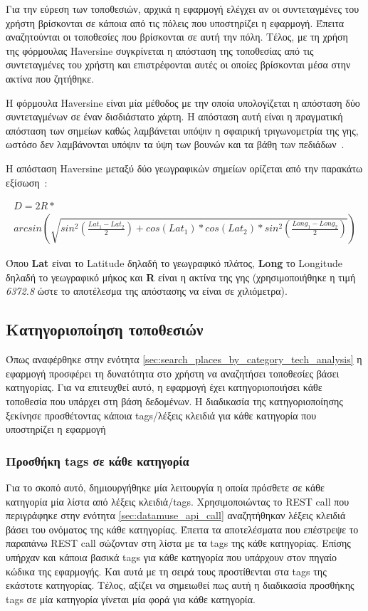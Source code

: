 \documentclass[oneside, 12pt]{book}
\begin{document}
Για την εύρεση των τοποθεσιών, αρχικά η εφαρμογή ελέγχει αν οι 
συντεταγμένες του χρήστη βρίσκονται σε κάποια από τις πόλεις που 
υποστηρίζει η εφαρμογή. Έπειτα αναζητούνται οι τοποθεσίες που 
βρίσκονται σε αυτή την πόλη. Τέλος, με τη χρήση της φόρμουλας 
Haversine συγκρίνεται η απόσταση της τοποθεσίας από τις 
συντεταγμένες του χρήστη και επιστρέφονται αυτές οι οποίες 
βρίσκονται μέσα στην ακτίνα που ζητήθηκε.

Η φόρμουλα Haversine είναι μία μέθοδος με την οποία υπολογίζεται η 
απόσταση δύο συντεταγμένων σε έναν δισδιάστατο χάρτη. Η απόσταση 
αυτή είναι η πραγματική απόσταση των σημείων καθώς λαμβάνεται 
υπόψιν η σφαιρική τριγωνομετρία της γης, ωστόσο δεν λαμβάνονται 
υπόψιν τα ύψη των βουνών και τα βάθη των πεδιάδων~\cite{alam2016implementation}.

Η απόσταση Haversine μεταξύ δύο γεωγραφικών σημείων ορίζεται από την παρακάτω εξίσωση~\cite{yoga2017implementation}:

\begin{multline} \label{eq:haversine_equation}
    D = 2R*\\
    arcsin\left(\sqrt{sin^2(\frac{Lat_1-Lat_2}{2})+cos(Lat_1)*cos(Lat_2)*sin^2(\frac{Long_1-Long_2}{2})}\right)
\end{multline}

Όπου \textbf{Lat} είναι το Latitude δηλαδή το γεωγραφικό πλάτος,
\textbf{Long} το Longitude δηλαδή το γεωγραφικό μήκος και
\textbf{R} είναι η ακτίνα της γης (χρησιμοποιήθηκε η τιμή \textit{6372.8} ώστε 
το αποτέλεσμα της απόστασης να είναι σε χιλιόμετρα).

\subsection{Κατηγοριοποίηση τοποθεσιών}\label{sec:location_categorization}
Όπως αναφέρθηκε στην ενότητα \ref{sec:search_places_by_category_tech_analysis}
η εφαρμογή προσφέρει τη δυνατότητα στο χρήστη να αναζητήσει τοποθεσίες βάσει κατηγορίας. Για να επιτευχθεί αυτό, η εφαρμογή έχει κατηγοριοποιήσει κάθε τοποθεσία που υπάρχει στη βάση δεδομένων.
Η διαδικασία της κατηγοριοποίησης ξεκίνησε προσθέτοντας κάποια tags/λέξεις κλειδιά για κάθε κατηγορία που υποστηρίζει η εφαρμογή

\subsubsection{Προσθήκη tags σε κάθε κατηγορία}
Για το σκοπό αυτό, δημιουργήθηκε μία λειτουργία η οποία πρόσθετε σε 
κάθε κατηγορία μία λίστα από λέξεις κλειδιά/tags.
Χρησιμοποιώντας το REST call που περιγράφηκε στην ενότητα 
\ref{sec:datamuse_api_call} αναζητήθηκαν λέξεις κλειδιά βάσει του 
ονόματος της κάθε κατηγορίας. Έπειτα τα αποτελέσματα που επέστρεψε 
το παραπάνω REST call σώζονταν στη λίστα με τα tags της κάθε 
κατηγορίας. Επίσης υπήρχαν και κάποια βασικά tags για κάθε 
κατηγορία που υπάρχουν στον πηγαίο κώδικα της εφαρμογής. Και αυτά με
τη σειρά τους προστίθενται στα tags της εκάστοτε κατηγορίας.
Τέλος, αξίζει να σημειωθεί πως αυτή η διαδικασία προσθήκης tags σε 
μία κατηγορία γίνεται μία φορά για κάθε κατηγορία.
\end{document}
